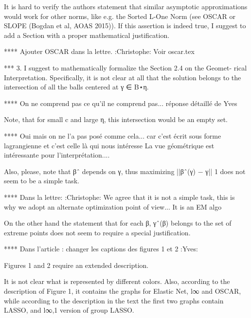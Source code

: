 \documentclass[a4paper,11pt]{texMemo}
\begin{document}
It is hard to verify the authors statement that similar asymptotic approximations would work for other norms, 
like e.g. the Sorted L-One Norm (see OSCAR or SLOPE (Bogdan et al, AOAS 2015)).
 If this assertion is indeed true,  I suggest to add a Section with a proper mathematical justification.

**** Ajouter OSCAR dans la lettre.                               :Christophe:
Voir oscar.tex





*** 3. I suggest to mathematically formalize the Section 2.4 
on the Geomet- rical Interpretation. Specifically,
 it is not clear at all that the solution belongs to the intersection of all the balls centered at γ ∈ B⋆η. 

**** On ne comprend pas ce qu'il ne comprend pas... réponse détaillé de Yves

Note, that for small c and large η, this intersection would be an empty set.

**** Oui mais on ne l'a pas posé comme cela... car c'est écrit sous forme lagrangienne et c'est celle là qui nous intéresse
La vue géométrique est intéressante pour l'interprétation.... 


Also, please, note that βˆ depends on γ, thus maximizing
||βˆ(γ) − γ|| 1
does not seem to be a simple task.

**** Dans la lettre:                                             :Christophe:
We agree that it is not a simple task, this is why we adopt an alternate optimization point of view... It is an EM algo


On the other hand the statement that for each β, γˆ(β) belongs 
to the set of extreme points does not seem to require a special justification.

**** Dans l'article : changer les captions des figures 1 et 2  :Yves:

Figures 1 and 2 require an extended description.



 It is not clear what is represented by different colors.
 Also, according to the description of Figure 1,
 it contains the graphs for Elastic Net, l∞ and OSCAR, while according to the description in the text
 the first two graphs contain LASSO, and l∞,1 version of group LASSO.
\end{document}
